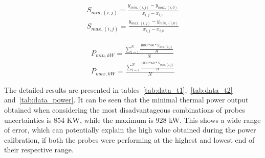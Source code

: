 \begin{equation}\label{eq5}
\begin{aligned}
S_{min, (i,j)} = \frac{y_{min, (i,j)} - y_{max, (i,0)}}{x_{i,j} - x_{i,0}} \\
S_{max, (i,j)} = \frac{y_{max, (i,j)} - y_{min, (i,0)}}{x_{i,j} - x_{i,0}}
\end{aligned}
\end{equation}

\begin{equation}\label{eq6}
\begin{aligned}
P_{min, kW} = \frac{\sum\limits_{i=1}^{N}{\frac{1000*60*S_{min, (i,j)}}{H}}}{N} \\
P_{max, kW} = \frac{\sum\limits_{i=1}^{N}{\frac{1000*60*S_{max, (i,j)}}{H}}}{N}
\end{aligned}
\end{equation}

The detailed results are presented in tables~\ref{tab:data_t1},~\ref{tab:data_t2} and~\ref{tab:data_power}. It can be seen that the minimal thermal power output obtained when considering the most disadvantageous combinations of probes uncertainties is 854 KW, while the maximum is 928 kW. This shows a wide range of error, which can potentially explain the high value obtained during the power calibration, if both the probes were performing at the highest and lowest end of their respective range.
